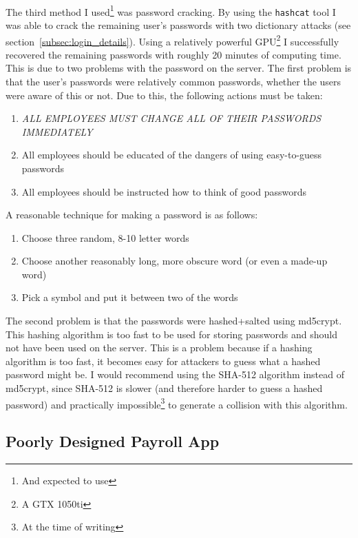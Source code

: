 \documentclass{article}
\begin{document}
\paragraph{}
The third method I used\footnote{And expected to use} was password cracking. By using the \texttt{hashcat} tool I was able to crack the remaining user's passwords with two dictionary attacks (see section~\ref{subsec:login_details}).
Using a relatively powerful GPU\footnote{A GTX 1050ti} I successfully recovered the remaining passwords with roughly 20 minutes of computing time.
This is due to two problems with the password on the server.
The first problem is that the user's passwords were relatively common passwords, whether the users were aware of this or not.
Due to this, the following actions must be taken:
\begin{enumerate}
	\item \emph{ALL EMPLOYEES MUST CHANGE ALL OF THEIR PASSWORDS IMMEDIATELY}
	\item All employees should be educated of the dangers of using easy-to-guess passwords
	\item All employees should be instructed how to think of good passwords
\end{enumerate}
A reasonable technique for making a password is as follows:
\begin{enumerate}
	\item Choose three random, 8-10 letter words
	\item Choose another reasonably long, more obscure word (or even a made-up word)
	\item Pick a symbol and put it between two of the words
\end{enumerate}
The second problem is that the passwords were hashed+salted using md5crypt.
This hashing algorithm is too fast to be used for storing passwords and should not have been used on the server.
This is a problem because if a hashing algorithm is too fast, it becomes easy for attackers to guess what a hashed password might be.
I would recommend using the SHA-512 algorithm instead of md5crypt, since SHA-512 is slower (and therefore harder to guess a hashed password) and practically impossible\footnote{At the time of writing} to generate a collision with this algorithm.

\subsection{Poorly Designed Payroll App}
\label{subsec:payroll_app}
\end{document}
